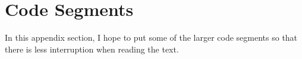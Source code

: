 \chapter{Code Segments}\label{app:CodeSegments}

In this appendix section, I hope to put some of the larger code segments so that there is less interruption when reading the text.